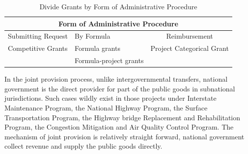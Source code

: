 \begin{table}[htbp]
    \centering
    \caption{Divide Grants by Form of Administrative Procedure}
    \begin{tabular}{clc}
        \toprule
        \multicolumn{3}{c}{Form of Administrative Procedure}                                                                                                     \\
        \midrule
        \multicolumn{1}{p{9.645em}}{ Submitting Request} & \multicolumn{1}{p{10.285em}}{               By Formula} & \multicolumn{1}{p{10.855em}}{Reimbursement} \\
        \midrule
        \multicolumn{1}{l}{Competitive Grants}           & Formula grants                                          & Project Categorical Grant                   \\
                                                         & Formula-project grants                                  &                                             \\
        \bottomrule
    \end{tabular}%
    \label{Table 1.4}%
\end{table}%

In the joint provision process, unlike intergovernmental transfers, national government is the direct provider for part of the public goods in subnational jurisdictions. Such cases wildly exist in those projects under Interstate Maintenance Program, the National Highway Program, the Surface Transportation Program, the Highway bridge Replacement and Rehabilitation Program, the Congestion Mitigation and Air Quality Control Program. The mechanism of joint provision is relatively straight forward, national government collect revenue and supply the public goods directly.

